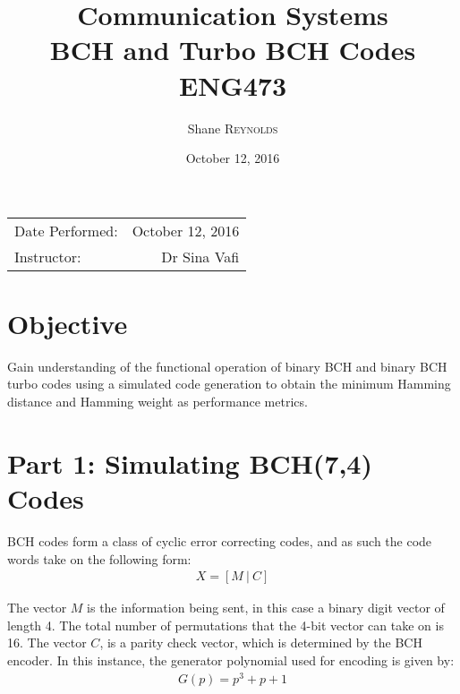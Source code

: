 \documentclass{article}
\title{Communication Systems \\ BCH and Turbo BCH Codes \\ ENG473} %
\author{Shane \textsc{Reynolds}} %
\date{October 12, 2016} %
\begin{document}
\maketitle %

\begin{center}
\begin{tabular}{l r}
Date Performed: & October 12, 2016 \\ %
Instructor: & Dr Sina Vafi %
\end{tabular}
\end{center}



\section{Objective}

Gain understanding of the functional operation of binary BCH and binary BCH turbo codes using a simulated code generation to obtain the minimum Hamming distance and Hamming weight as performance metrics.


\section{Part 1: Simulating BCH(7,4) Codes}

BCH codes form a class of cyclic error correcting codes, and as such the code words take on the following form:
\begin{align*}
	X = [M \ | \ C]
\end{align*}

The vector $M$ is the information being sent, in this case a binary digit vector of length 4. The total number of permutations that the 4-bit vector can take on is 16. The vector $C$, is a parity check vector, which is determined by the BCH encoder. In this instance, the generator polynomial used for encoding is given by:
\begin{align*}
	G(p) = p^3 + p + 1
\end{align*}
\end{document}
